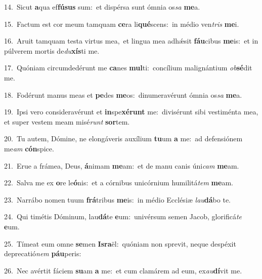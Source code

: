 {\numbfont\textcolor{\numbcolor}{14.}}~Sicut \textbf{a}\-qua ef\-\textbf{fú}\-\textbf{sus} sum:~\star et dispérsa sunt ómnia os\textit{sa} \textbf{me}\-a.\par
{\numbfont\textcolor{\numbcolor}{15.}}~Factum est cor meum tamquam \textbf{ce}\-ra li\-\textbf{qué}\-scens:~\star in médio ven\textit{tris} \textbf{me}\-i.\par
{\numbfont\textcolor{\numbcolor}{16.}}~Aruit tamquam testa virtus mea,~\dagger et lingua mea adhǽsit \textbf{fáu}\-cibus \textbf{me}\-is:~\star et in púlverem mortis de\-\textit{du}\-\textbf{xís}ti me.\par
{\numbfont\textcolor{\numbcolor}{17.}}~Quóniam circumdedérunt me \textbf{ca}\-nes \textbf{mul}\-ti:~\star concílium malignántium \textit{ob}\-\textbf{sé}dit me.\par
{\numbfont\textcolor{\numbcolor}{18.}}~Fodérunt manus meas et \textbf{pe}\-des \textbf{me}\-os:~\star dinumeravérunt ómnia os\textit{sa} \textbf{me}\-a.\par
{\numbfont\textcolor{\numbcolor}{19.}}~Ipsi vero consideravérunt et \textbf{in}\-spe\-\textbf{xé}\-\textbf{runt} me:~\star divisérunt sibi vestiménta mea, et super vestem meam misé\textit{runt} \textbf{sor}\-tem.\par
{\numbfont\textcolor{\numbcolor}{20.}}~Tu autem, Dómine, ne elongáveris auxílium \textbf{tu}\-um \textbf{a} me:~\star ad defensiónem me\textit{am} \textbf{cón}\-spice.\par
{\numbfont\textcolor{\numbcolor}{21.}}~Erue a frámea, Deus, \textbf{á}\-nimam \textbf{me}\-am:~\star et de manu canis úni\textit{cam} \textbf{me}\-am.\par
{\numbfont\textcolor{\numbcolor}{22.}}~Salva me ex \textbf{o}\-re le\-\textbf{ó}\-nis:~\star et a córnibus unicórnium humilitá\textit{tem} \textbf{me}\-am.\par
{\numbfont\textcolor{\numbcolor}{23.}}~Narrábo nomen tuum \textbf{frá}\-tribus \textbf{me}\-is:~\star in médio Ecclésiæ \textit{lau}\-\textbf{dá}bo te.\par
{\numbfont\textcolor{\numbcolor}{24.}}~Qui timétis Dóminum, lau\-\textbf{dá}\-te \textbf{e}\-um:~\star univérsum semen Jacob, glorificá\textit{te} \textbf{e}\-um.\par
{\numbfont\textcolor{\numbcolor}{25.}}~Tímeat eum omne \textbf{se}\-men \textbf{Is}\-\textbf{ra}ël:~\star quóniam non sprevit, neque despéxit deprecatió\textit{nem} \textbf{páu}\-peris:\par
{\numbfont\textcolor{\numbcolor}{26.}}~Nec avértit fáciem \textbf{su}\-am \textbf{a} me:~\star et cum clamárem ad eum, ex\-\textit{au}\-\textbf{dí}vit me.\par
